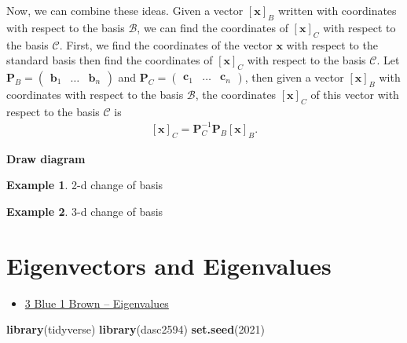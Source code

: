 \documentclass[
]{book}
\newenvironment{Shaded}{\begin{snugshade}}{\end{snugshade}}
\newcommand{\DecValTok}[1]{\textcolor[rgb]{0.00,0.00,0.81}{#1}}
\newcommand{\KeywordTok}[1]{\textcolor[rgb]{0.13,0.29,0.53}{\textbf{#1}}}
\newcommand{\NormalTok}[1]{#1}
\providecommand{\tightlist}{%
  \setlength{\itemsep}{0pt}\setlength{\parskip}{0pt}}
\theoremstyle{definition}
\theoremstyle{definition}
\newtheorem{example}{Example}[chapter]
\theoremstyle{definition}
\theoremstyle{definition}
\theoremstyle{remark}
\begin{document}
Now, we can combine these ideas. Given a vector \(\left[\mathbf{x}\right]_B\) written with coordinates with respect to the basis \(\mathcal{B}\), we can find the coordinates of \(\left[\mathbf{x}\right]_C\) with respect to the basis \(\mathcal{C}\). First, we find the coordinates of the vector \(\mathbf{x}\) with respect to the standard basis then find the coordinates of \(\left[\mathbf{x}\right]_C\) with respect to the basis \(\mathcal{C}\). Let \(\mathbf{P}_B = \begin{pmatrix} \mathbf{b}_1 & \ldots & \mathbf{b}_n \end{pmatrix}\) and \(\mathbf{P}_C = \begin{pmatrix} \mathbf{c}_1 & \ldots & \mathbf{c}_n \end{pmatrix}\), then given a vector \(\left[\mathbf{x}\right]_B\) with coordinates with respect to the basis \(\mathcal{B}\), the coordinates \(\left[\mathbf{x}\right]_C\) of this vector with respect to the basis \(\mathcal{C}\) is
\[
\begin{aligned}
\left[\mathbf{x}\right]_C = \mathbf{P}_C^{-1} \mathbf{P}_B \left[\mathbf{x}\right]_B.
\end{aligned}
\]

\textbf{Draw diagram}

\begin{example}
2-d change of basis
\end{example}

\begin{example}
3-d change of basis
\end{example}

\hypertarget{eigenvectors-and-eigenvalues}{%
\chapter{Eigenvectors and Eigenvalues}\label{eigenvectors-and-eigenvalues}}

\begin{itemize}
\tightlist
\item
  \href{https://www.3blue1brown.com/lessons/eigenvalues}{3 Blue 1 Brown -- Eigenvalues}
\end{itemize}

\begin{Shaded}
\begin{Highlighting}[]
\KeywordTok{library}\NormalTok{(tidyverse)}
\KeywordTok{library}\NormalTok{(dasc2594)}
\KeywordTok{set.seed}\NormalTok{(}\DecValTok{2021}\NormalTok{)}
\end{Highlighting}
\end{Shaded}
\end{document}
